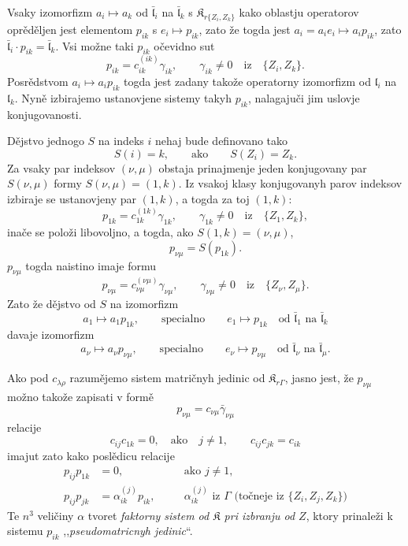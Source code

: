 \documentclass[11pt]{article}
\begin{document}
Vsaky izomorfizm \(a_i\mapsto a_k\) od \(\bar{\mathfrak l}_i\) na \(\bar{\mathfrak l}_k\) s \(\mathfrak K_{r\{Z_i,Z_k\}}\) kako oblastju operatorov oprěděljen jest elementom \(p_{ik}\) s \(e_i\mapsto p_{ik}\), zato že togda jest \(a_i=a_ie_i\mapsto a_ip_{ik}\), zato \(\bar{\mathfrak l}_i\cdot p_{ik}=\bar{\mathfrak l}_k\). Vsi možne taki \(p_{ik}\) očevidno sut
\[
p_{ik}=c_{ik}^{(ik)}\gamma_{ik},\qquad \gamma_{ik}\ne0\quad\text{iz}\quad \{Z_i,Z_k\}.
\]
Posrědstvom \(a_i\mapsto a_ip_{ik}\) togda jest zadany takože operatorny izomorfizm od \(\mathfrak l_i\) na \(\mathfrak l_k\). Nyně izbirajemo ustanovjene sistemy takyh \(p_{ik}\), nalagajuči jim uslovje konjugovanosti.

Dějstvo jednogo \(S\) na indeks \(i\) nehaj bude definovano tako
\[
S(i)=k,\qquad\text{ako}\qquad S(Z_i)=Z_k.
\]
Za vsaky par indeksov \((\nu,\mu)\) obstaja prinajmenje jeden konjugovany par \(S(\nu,\mu)\) formy \(S(\nu,\mu)=(1,k)\). Iz vsakoj klasy konjugovanyh parov indeksov izbiraje se ustanovjeny par \((1,k)\), a togda za toj \((1,k)\):
\[
p_{1k}=c_{1k}^{(1k)}\gamma_{1k},\qquad \gamma_{1k}\ne0\quad\text{iz}\quad \{Z_1,Z_k\},
\]
inače se položi libovoljno, a togda, ako \(S(1,k)=(\nu,\mu)\),
\[
p_{\nu\mu}=S(p_{1k}).
\]
\(p_{\nu\mu}\) togda naistino imaje formu
\[
p_{\nu\mu}=c_{\nu\mu}^{(\nu\mu)}\gamma_{\nu\mu},\qquad
\gamma_{\nu\mu}\ne0\quad\text{iz}\quad \{Z_\nu,Z_\mu\}.
\]
Zato že dějstvo od \(S\) na izomorfizm
\[
a_1\mapsto a_1p_{1k},\qquad\text{specialno}\qquad e_1\mapsto p_{1k}
\quad\text{od }\bar{\mathfrak l}_1\text{ na }\bar{\mathfrak l}_k
\]
davaje izomorfizm
\[
a_\nu\mapsto a_\nu p_{\nu\mu},\qquad\text{specialno}\qquad e_\nu\mapsto p_{\nu\mu}
\quad\text{od }\bar{\mathfrak l}_\nu\text{ na }\bar{\mathfrak l}_\mu.
\]

Ako pod \(c_{\lambda\rho}\) razumějemo sistem matričnyh jedinic od \(\mathfrak K_{r\Gamma}\), jasno jest, že \(p_{\nu\mu}\) možno takože zapisati v formě
\[
p_{\nu\mu}=c_{\nu\mu}\bar\gamma_{\nu\mu}
\]
relacije
\[
c_{ij}c_{1k}=0,\quad\text{ako}\quad j\ne1,
\qquad
c_{ij}c_{jk}=c_{ik}
\]
imajut zato kako poslědicu relacije
\[
\begin{aligned}
p_{ij}p_{1k}&=0,\quad &&\text{ako }j\ne1,\\
p_{ij}p_{jk}&=\alpha_{ik}^{(j)}p_{ik},\quad
&&\alpha_{ik}^{(j)}\text{ iz }\Gamma\text{ (točneje iz }\{Z_i,Z_j,Z_k\}\text{)}
\end{aligned}
\]
Te \(n^3\) veličiny \(\alpha\) tvoret \emph{faktorny sistem od \(\mathfrak K\) pri izbranju od \(Z\)}, ktory prinaleži k sistemu \(p_{ik}\) ,,\emph{pseudomatricnyh jedinic}``.
\end{document}
